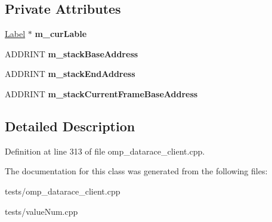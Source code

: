 \subsection*{Private Attributes}
\begin{DoxyCompactItemize}
\item 
\hypertarget{classThreadData__t_ac8e6170984be28f9e57e90beed9a82d4}{\hyperlink{classLabel}{Label} $\ast$ {\bfseries m\-\_\-cur\-Lable}}\label{classThreadData__t_ac8e6170984be28f9e57e90beed9a82d4}

\item 
\hypertarget{classThreadData__t_acd83394e85e1fa4bb1b59a21d786e3ef}{A\-D\-D\-R\-I\-N\-T {\bfseries m\-\_\-stack\-Base\-Address}}\label{classThreadData__t_acd83394e85e1fa4bb1b59a21d786e3ef}

\item 
\hypertarget{classThreadData__t_a641efc9b509cb1c13db730b0ab15cb06}{A\-D\-D\-R\-I\-N\-T {\bfseries m\-\_\-stack\-End\-Address}}\label{classThreadData__t_a641efc9b509cb1c13db730b0ab15cb06}

\item 
\hypertarget{classThreadData__t_a7125562cbda6e795f70585a96cc46fc4}{A\-D\-D\-R\-I\-N\-T {\bfseries m\-\_\-stack\-Current\-Frame\-Base\-Address}}\label{classThreadData__t_a7125562cbda6e795f70585a96cc46fc4}

\end{DoxyCompactItemize}


\subsection{Detailed Description}


Definition at line 313 of file omp\-\_\-datarace\-\_\-client.\-cpp.



The documentation for this class was generated from the following files\-:\begin{DoxyCompactItemize}
\item 
tests/omp\-\_\-datarace\-\_\-client.\-cpp\item 
tests/value\-Num.\-cpp\end{DoxyCompactItemize}

